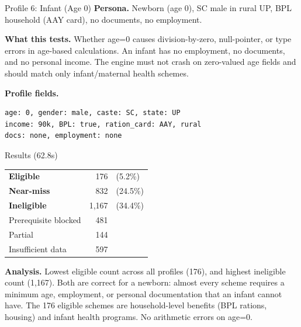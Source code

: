 \documentclass[11pt,a4paper]{article}
\begin{document}
\begin{profilebox}{Profile 6: Infant (Age 0)}
\textbf{Persona.} Newborn (age 0), SC male in rural UP, BPL household (AAY card), no documents, no employment.

\textbf{What this tests.} Whether age=0 causes division-by-zero, null-pointer, or type errors in age-based calculations. An infant has no employment, no documents, and no personal income. The engine must not crash on zero-valued age fields and should match only infant/maternal health schemes.

\textbf{Profile fields.}
\begin{lstlisting}
age: 0, gender: male, caste: SC, state: UP
income: 90k, BPL: true, ration_card: AAY, rural
docs: none, employment: none
\end{lstlisting}

\begin{resultbox}{Results (62.8s)}
\begin{tabular}{@{}lrl@{}}
  \textcolor{eligible}{\textbf{Eligible}} & 176 & (5.2\%) \\
  \textcolor{nearmiss}{\textbf{Near-miss}} & 832 & (24.5\%) \\
  \textcolor{inelig}{\textbf{Ineligible}} & 1{,}167 & (34.4\%) \\
  Prerequisite blocked & 481 & \\
  Partial & 144 & \\
  Insufficient data & 597 & \\
\end{tabular}
\end{resultbox}

\textbf{Analysis.} Lowest eligible count across all profiles (176), and highest ineligible count (1{,}167). Both are correct for a newborn: almost every scheme requires a minimum age, employment, or personal documentation that an infant cannot have. The 176 eligible schemes are household-level benefits (BPL rations, housing) and infant health programs. No arithmetic errors on age=0.
\end{profilebox}
\end{document}
